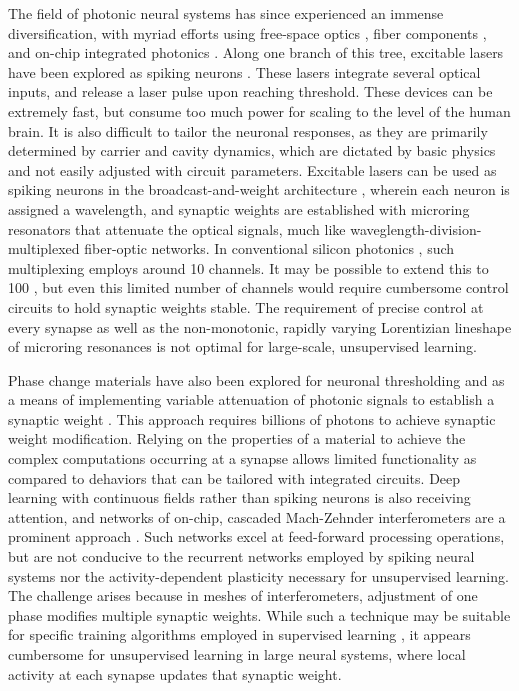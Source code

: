 \documentclass[twocolumn]{article}
\begin{document}
The field of photonic neural systems has since experienced an immense diversification, with myriad efforts using free-space optics \cite{habe2019}, fiber components \cite{prsh2017}, and on-chip integrated photonics \cite{shha2016,vame2014,tafe2019}. Along one branch of this tree, excitable lasers have been explored as spiking neurons \cite{prsh2017}. These lasers integrate several optical inputs, and release a laser pulse upon reaching threshold. These devices can be extremely fast, but consume too much power for scaling to the level of the human brain. It is also difficult to tailor the neuronal responses, as they are primarily determined by carrier and cavity dynamics, which are dictated by basic physics and not easily adjusted with circuit parameters. Excitable lasers can be used as spiking neurons in the broadcast-and-weight architecture \cite{tana20142}, wherein each neuron is assigned a wavelength, and synaptic weights are established with microring resonators that attenuate the optical signals, much like waveglength-division-multiplexed fiber-optic networks. In conventional silicon photonics {\cite{li2005}}, such multiplexing employs around 10 channels. It may be possible to extend this to 100 \cite{prsh2011,tana20142}, but even this limited number of channels would require cumbersome control circuits to hold synaptic weights stable. The requirement of precise control at every synapse as well as the non-monotonic, rapidly varying Lorentizian lineshape of microring resonances is not optimal for large-scale, unsupervised learning. 

Phase change materials have also been explored for neuronal thresholding \cite{chsa2018} and as a means of implementing variable attenuation of photonic signals to establish a synaptic weight \cite{chri2017}. This approach requires billions of photons to achieve synaptic weight modification. Relying on the properties of a material to achieve the complex computations occurring at a synapse allows limited functionality as compared to dehaviors that can be tailored with integrated circuits. Deep learning with continuous fields rather than spiking neurons is also receiving attention, and networks of on-chip, cascaded Mach-Zehnder interferometers are a prominent approach \cite{shha2016}. Such networks excel at feed-forward processing operations, but are not conducive to the recurrent networks employed by spiking neural systems nor the activity-dependent plasticity necessary for unsupervised learning. The challenge arises because in meshes of interferometers, adjustment of one phase modifies multiple synaptic weights. While such a technique may be suitable for specific training algorithms employed in supervised learning \cite{humi2018}, it appears cumbersome for unsupervised learning in large neural systems, where local activity at each synapse updates that synaptic weight.
\end{document}
